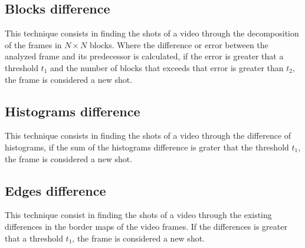 \documentclass[journal]{IEEEtran}
\begin{document}
\subsection{Blocks difference}

This technique consists in finding the shots of a video through the decomposition of the frames in $N\times N$ blocks. Where the difference or error between the analyzed frame and its predecessor is calculated, if the error is greater that a threshold $t_1$ and the number of blocks that exceeds that error is greater than $t_2$, the frame is considered a new shot.


\subsection{Histograms difference}
This technique consists in finding the shots of a video through the difference of histograms, if the sum of the histograms difference is grater that the threshold $t_1$, the frame is considered a new shot.

\subsection{Edges difference}
This technique consist in finding the shots of a video through the existing differences in the border maps of the video frames. If the differences is greater that a threshold $t_1$, the frame is considered a new shot.
\end{document}

